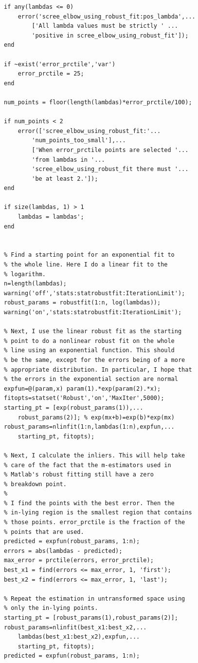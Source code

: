\documentclass[10pt,letterpaper]{book}
\begin{document}
\begin{lstlisting}
if any(lambdas <= 0)
    error('scree_elbow_using_robust_fit:pos_lambda',...
        ['All lambda values must be strictly ' ...
        'positive in scree_elbow_using_robust_fit']);
end

if ~exist('error_prctile','var')
    error_prctile = 25;
end

num_points = floor(length(lambdas)*error_prctile/100);

if num_points < 2
    error(['scree_elbow_using_robust_fit:'...
        'num_points_too_small'],...
        ['When error_prctile points are selected '...
        'from lambdas in '...
        'scree_elbow_using_robust_fit there must '...
        'be at least 2.']);
end

if size(lambdas, 1) > 1
    lambdas = lambdas';
end


% Find a starting point for an exponential fit to
% the whole line. Here I do a linear fit to the
% logarithm.
n=length(lambdas);
warning('off','stats:statrobustfit:IterationLimit');
robust_params = robustfit(1:n, log(lambdas));
warning('on','stats:statrobustfit:IterationLimit');

% Next, I use the linear robust fit as the starting
% point to do a nonlinear robust fit on the whole
% line using an exponential function. This should
% be the same, except for the errors being of a more
% appropriate distribution. In particular, I hope that
% the errors in the exponential section are normal
expfun=@(param,x) param(1).*exp(param(2).*x);
fitopts=statset('Robust','on','MaxIter',5000);
starting_pt = [exp(robust_params(1)),...
    robust_params(2)]; % exp(mx+b)=exp(b)*exp(mx)
robust_params=nlinfit(1:n,lambdas(1:n),expfun,...
    starting_pt, fitopts);

% Next, I calculate the inliers. This will help take
% care of the fact that the m-estimators used in
% Matlab's robust fitting still have a zero
% breakdown point.
%
% I find the points with the best error. Then the
% in-lying region is the smallest region that contains
% those points. error_prctile is the fraction of the
% points that are used.
predicted = expfun(robust_params, 1:n);
errors = abs(lambdas - predicted);
max_error = prctile(errors, error_prctile);
best_x1 = find(errors <= max_error, 1, 'first');
best_x2 = find(errors <= max_error, 1, 'last');

% Repeat the estimation in untransformed space using
% only the in-lying points. 
starting_pt = [robust_params(1),robust_params(2)];
robust_params=nlinfit(best_x1:best_x2,...
    lambdas(best_x1:best_x2),expfun,...
    starting_pt, fitopts);
predicted = expfun(robust_params, 1:n);


\end{lstlisting}
\end{document}
